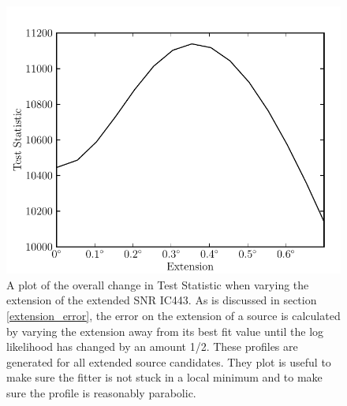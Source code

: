 \documentclass[12pt,preprint]{aastex}
\begin{document}
\clearpage
\begin{figure}
  \begin{center}
    \includegraphics{ic443_plots/profile_ic443.pdf}
    \caption{
    A plot of the overall change in Test Statistic when varying the
    extension of the extended SNR IC443.  As is discussed in section
    \ref{extension_error}, the error on the extension of a source is
    calculated by varying the extension away from its best fit value until
    the log likelihood has changed by an amount 1/2.  These profiles are
    generated for all extended source candidates. They plot is useful
    to make sure the fitter is not stuck in a local minimum and to make
    sure the profile is reasonably parabolic.
    }
    \label{extension_profile}
  \end{center}
\end{figure}
\end{document}
